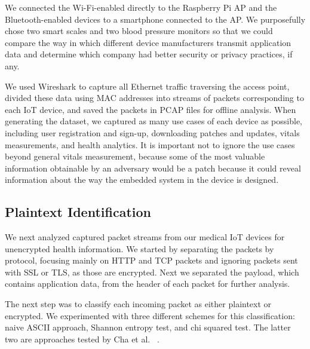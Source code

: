 We connected the Wi-Fi-enabled directly to the Raspberry Pi AP and the Bluetooth-enabled devices to a smartphone connected to the AP.
We purposefully chose two smart scales and two blood pressure monitors so that we could compare the way in which different device manufacturers transmit application data and determine which company had better security or privacy practices, if any. 

We used Wireshark to capture all Ethernet traffic traversing the access point, divided these data using MAC addresses into streams of packets corresponding to each IoT device, and saved the packets in PCAP files for offline analysis. 
 When generating the dataset, we captured as many use cases of each device as possible, including user registration and sign-up, downloading patches and updates, vitals measurements, and health analytics. It is important not to ignore the use cases beyond general vitals measurement, because some of the most valuable information obtainable by an adversary would be a patch because it could reveal information about the way the embedded system in the device is designed. 

\subsection{Plaintext Identification}

We next analyzed captured packet streams from our medical IoT devices for unencrypted health information. We started by separating the packets by protocol, focusing mainly on HTTP and TCP packets and ignoring packets sent with SSL or TLS, as those are encrypted. Next we separated the payload, which contains application data, from the header of each packet for further analysis. 

The next step was to classify each incoming packet as either plaintext or encrypted. We experimented with three different schemes for this classification: naive ASCII approach, Shannon entropy test, and chi squared test. The latter two are approaches tested by Cha et al. ~\cite{chaMachineLearning}.

